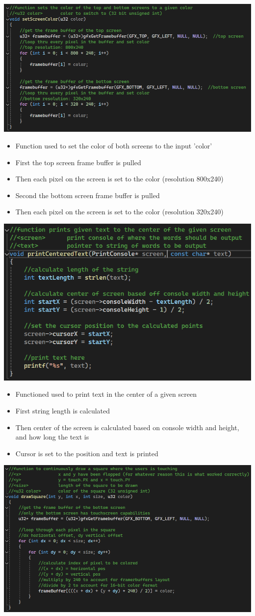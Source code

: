 \documentclass{article}
\begin{document}
\includegraphics[width=0.75\linewidth]{image.png}     %
    \begin{itemize}
        \item Function used to set the color of both screens to the input 'color'
        \item First the top screen frame buffer is pulled
        \item Then each pixel on the screen is set to the color (resolution 800x240)
        \item Second the bottom screen frame buffer is pulled
        \item Then each pixel on the screen is set to the color (resolution 320x240)
    \end{itemize}
\includegraphics[width=0.75\linewidth]{image2.png}    %
    \begin{itemize}
        \item Functioned used to print text in the center of a given screen
        \item First string length is calculated
        \item Then center of the screen is calculated based on console width and height, and how long the text is
        \item Cursor is set to the position and text is printed
    \end{itemize}
\includegraphics[width=0.75\linewidth]{image3.png}    %
\end{document}
